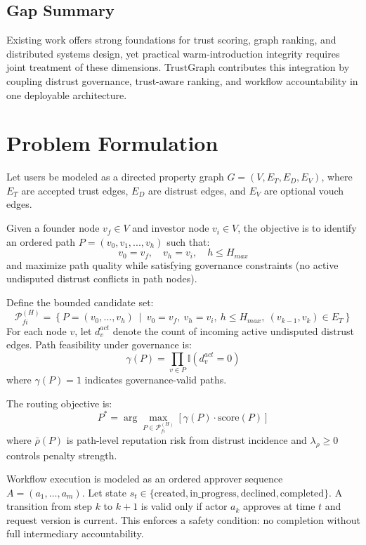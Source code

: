 \documentclass[conference]{IEEEtran}
\begin{document}
\subsection{Gap Summary}
Existing work offers strong foundations for trust scoring, graph ranking, and distributed systems design, yet practical warm-introduction integrity requires joint treatment of these dimensions. TrustGraph contributes this integration by coupling distrust governance, trust-aware ranking, and workflow accountability in one deployable architecture.

\section{Problem Formulation}
Let users be modeled as a directed property graph $G=(V, E_T, E_D, E_V)$, where $E_T$ are accepted trust edges, $E_D$ are distrust edges, and $E_V$ are optional vouch edges.

Given a founder node $v_f \in V$ and investor node $v_i \in V$, the objective is to identify an ordered path $P = (v_0, v_1, ..., v_h)$ such that:
\begin{equation}
    v_0 = v_f, \quad v_h = v_i, \quad h \leq H_{max}
\end{equation}
and maximize path quality while satisfying governance constraints (no active undisputed distrust conflicts in path nodes).

Define the bounded candidate set:
\begin{equation}
\mathcal{P}_{fi}^{(H)} = \left\{P=(v_0,\ldots,v_h)\ \middle|\ v_0=v_f,\ v_h=v_i,\ h\leq H_{max},\ (v_{k-1},v_k)\in E_T\right\}
\end{equation}
For each node $v$, let $d_v^{act}$ denote the count of incoming active undisputed distrust edges. Path feasibility under governance is:
\begin{equation}
\gamma(P)=\prod_{v\in P}\mathbb{I}(d_v^{act}=0)
\end{equation}
where $\gamma(P)=1$ indicates governance-valid paths.

The routing objective is:
\begin{equation}
P^*=\arg\max_{P\in\mathcal{P}_{fi}^{(H)}}\left[\gamma(P)\cdot\text{score}(P)\right]
\end{equation}
where $\bar{\rho}(P)$ is path-level reputation risk from distrust incidence and $\lambda_{\rho}\geq 0$ controls penalty strength.

Workflow execution is modeled as an ordered approver sequence $A=(a_1,\ldots,a_m)$. Let state $s_t\in\{\text{created},\text{in\_progress},\text{declined},\text{completed}\}$. A transition from step $k$ to $k+1$ is valid only if actor $a_k$ approves at time $t$ and request version is current. This enforces a safety condition: no completion without full intermediary accountability.
\end{document}

